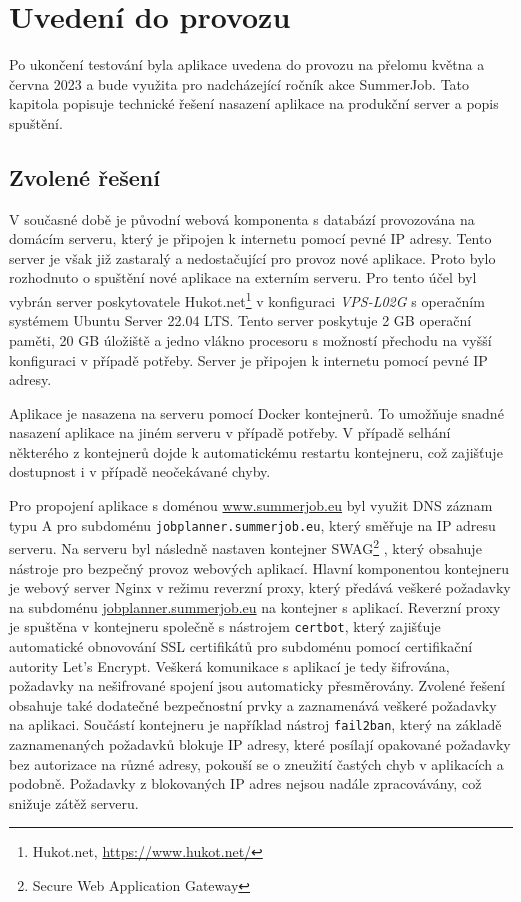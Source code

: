 \chapter{Uvedení do provozu}

Po ukončení testování byla aplikace uvedena do provozu na přelomu května a června 2023 a bude využita
pro nadcházející ročník akce SummerJob. Tato kapitola popisuje
technické řešení nasazení aplikace na produkční server a popis spuštění.

\section{Zvolené řešení}

V současné době je původní webová komponenta s databází provozována na domácím serveru,
který je připojen k internetu pomocí pevné IP adresy. Tento server je však již zastaralý a
nedostačující pro provoz nové aplikace. Proto bylo rozhodnuto o spuštění nové aplikace na
externím serveru. Pro tento účel byl vybrán server poskytovatele Hukot.net\footnote{Hukot.net, \url{https://www.hukot.net/}}
v konfiguraci \textit{VPS-L02G} s operačním systémem Ubuntu Server 22.04 LTS. Tento server
poskytuje 2 GB operační paměti, 20 GB úložiště a jedno vlákno procesoru s možností přechodu
na vyšší konfiguraci v případě potřeby. Server je připojen k internetu pomocí pevné IP adresy.

Aplikace je nasazena na serveru pomocí Docker kontejnerů. To umožňuje snadné nasazení aplikace
na jiném serveru v případě potřeby. V případě selhání některého z kontejnerů dojde k automatickému
restartu kontejneru, což zajišťuje dostupnost i v případě neočekávané chyby.

Pro propojení aplikace s doménou \url{www.summerjob.eu} byl využit DNS záznam typu A pro subdoménu
\texttt{jobplanner.summerjob.eu}, který směřuje na IP adresu serveru. Na serveru byl následně
nastaven kontejner SWAG\footnote{Secure Web Application Gateway} \cite{swag}, který obsahuje nástroje pro bezpečný provoz webových aplikací.
Hlavní komponentou kontejneru je webový server Nginx v režimu reverzní proxy, který předává veškeré požadavky na subdoménu
\href{https://jobplanner.summerjob.eu}{jobplanner.summerjob.eu} na kontejner s aplikací. Reverzní proxy je spuštěna v kontejneru
společně s nástrojem \texttt{certbot}, který zajišťuje automatické obnovování SSL certifikátů pro subdoménu
pomocí certifikační autority Let's Encrypt. Veškerá komunikace s aplikací je tedy šifrována, požadavky na
nešifrované spojení jsou automaticky přesměrovány. 
Zvolené řešení obsahuje také dodatečné bezpečnostní prvky a zaznamenává veškeré požadavky na aplikaci.
Součástí kontejneru je například nástroj \texttt{fail2ban}, který na základě zaznamenaných požadavků
blokuje IP adresy, které posílají opakované požadavky bez autorizace na různé adresy, pokouší se o
zneužití častých chyb v aplikacích a podobně. Požadavky z blokovaných IP adres nejsou nadále zpracovávány, 
což snižuje zátěž serveru.


